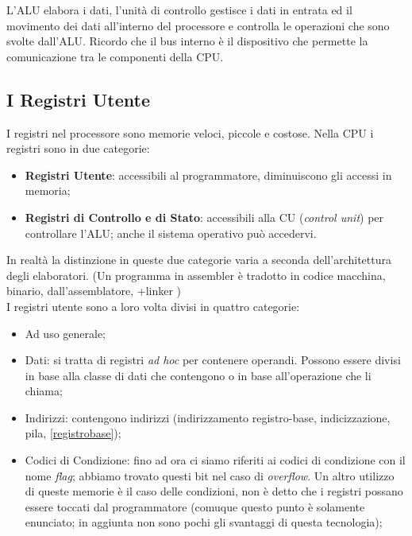\documentclass{article}
\begin{document}
L'ALU elabora i dati, l'unità di controllo gestisce i dati in entrata ed il movimento dei dati all'interno del processore e controlla le operazioni che sono svolte dall'ALU. Ricordo che il bus interno è il dispositivo che permette la comunicazione tra le componenti della CPU.

\subsection{I Registri Utente}

I registri nel processore sono memorie veloci, piccole e costose. Nella CPU i registri sono  in due categorie:
\begin{itemize}
	\item \textbf{Registri Utente}: accessibili al programmatore, diminuiscono gli accessi in memoria;

	\item \textbf{Registri di Controllo e di Stato}: accessibili alla CU (\textit{control unit}) per controllare l'ALU; anche il sistema operativo può accedervi.
\end{itemize}

In realtà la distinzione in queste due categorie varia a seconda dell'architettura degli elaboratori. (Un programma in assembler è tradotto in codice macchina, binario, dall'assemblatore, +linker )\\

I registri utente sono a loro volta divisi in quattro categorie:
\begin{itemize}
	\item Ad uso generale;

	\item Dati: si tratta di registri \textit{ad hoc} per contenere operandi. Possono essere divisi in base alla classe di dati che contengono o in base all'operazione che li chiama;

	\item Indirizzi: contengono indirizzi (indirizzamento registro-base, indicizzazione, pila, \autoref{registrobase});

	\item Codici di Condizione: fino ad ora ci siamo riferiti ai codici di condizione con il nome \textit{flag}; abbiamo trovato questi bit nel caso di \textit{overflow}. Un altro utilizzo di queste memorie è il caso delle condizioni, non è detto che i registri possano essere toccati dal programmatore (comuque questo punto è solamente enunciato; in aggiunta non sono pochi gli svantaggi di questa tecnologia);
\end{itemize}
\end{document}
